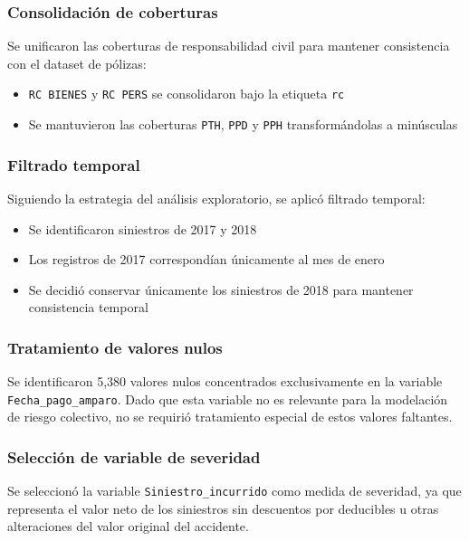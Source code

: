 \subsubsection{Consolidación de coberturas}

Se unificaron las coberturas de responsabilidad civil para mantener consistencia con el dataset de pólizas:

\begin{itemize}
    \item \texttt{RC BIENES} y \texttt{RC PERS} se consolidaron bajo la etiqueta \texttt{rc}
    \item Se mantuvieron las coberturas \texttt{PTH}, \texttt{PPD} y \texttt{PPH} transformándolas a minúsculas
\end{itemize}

\subsubsection{Filtrado temporal}

Siguiendo la estrategia del análisis exploratorio, se aplicó filtrado temporal:

\begin{itemize}
    \item Se identificaron siniestros de 2017 y 2018
    \item Los registros de 2017 correspondían únicamente al mes de enero
    \item Se decidió conservar únicamente los siniestros de 2018 para mantener consistencia temporal
\end{itemize}

\subsubsection{Tratamiento de valores nulos}

Se identificaron 5,380 valores nulos concentrados exclusivamente en la variable \texttt{Fecha\_pago\_amparo}. Dado que esta variable no es relevante para la modelación de riesgo colectivo, no se requirió tratamiento especial de estos valores faltantes.

\subsubsection{Selección de variable de severidad}

Se seleccionó la variable \texttt{Siniestro\_incurrido} como medida de severidad, ya que representa el valor neto de los siniestros sin descuentos por deducibles u otras alteraciones del valor original del accidente.

